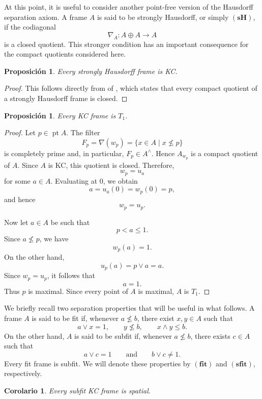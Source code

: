 \documentclass[11pt]{amsart}
\DeclareMathOperator{\pt}{pt}
\theoremstyle{plain}
\newtheorem{cor}[thm]{Corolario}
\newtheorem{prop}[thm]{Proposición}
\theoremstyle{definition}
\begin{document}
At this point, it is useful to consider another point-free version of
the Hausdorff separation axiom. A frame $A$ is said to be
strongly Hausdorff, or simply $\mathbf{(sH)}$, if the codiagonal
\[
    \nabla_A:A\oplus A\longrightarrow A
\]
is a closed quotient. This stronger condition has an important consequence for the compact
quotients considered here.

\begin{prop}\label{sHimplicaKC}
Every strongly Hausdorff frame is KC.
\end{prop}

\begin{proof}
This follows directly from of
\cite[Theorem~ III 9.2.1]{picado2021separation}, which states that every compact quotient of a
strongly Hausdorff frame is closed.
\end{proof}

\begin{prop}\label{KCT1}
Every KC frame is $T_1$.
\end{prop}

\begin{proof}
Let $p\in\pt A$. The filter
\[
F_p=\nabla(w_p)=\{x\in A\mid x\nleq p\}
\]
is completely prime and, in particular, $F_p\in A^\wedge$. Hence $A_{w_p}$
is a compact quotient of $A$. Since $A$ is KC, this quotient is closed.
Therefore,
\[
w_p=u_a
\]
for some $a\in A$. Evaluating at $0$, we obtain
\[
a=u_a(0)=w_p(0)=p,
\]
and hence
\[
w_p=u_p.
\]

Now let $a\in A$ be such that
\[
p<a\leq1.
\]
Since $a\nleq p$, we have
\[
w_p(a)=1.
\]
On the other hand,
\[
u_p(a)=p\vee a=a.
\]
Since $w_p=u_p$, it follows that
\[
a=1.
\]
Thus $p$ is maximal. Since every point of $A$ is maximal, $A$ is $T_1$.
\end{proof}

We briefly recall two separation properties that will be useful in what
follows. A frame \(A\) is said to be fit if, whenever
\(a\not\leq b\), there exist \(x,y\in A\) such that
\[
a\vee x=1,\qquad y\not\leq b,\qquad x\wedge y\leq b.
\]
On the other hand, \(A\) is said to be subfit if, whenever
\(a\not\leq b\), there exists \(c\in A\) such that
\[
a\vee c=1
\qquad\text{and}\qquad
b\vee c\neq 1.
\]
Every fit frame is subfit. We will denote these properties by
\(\mathbf{(fit)}\) and \(\mathbf{(sfit)}\), respectively.

\begin{cor}
Every subfit KC frame is spatial.
\end{cor}
\end{document}
